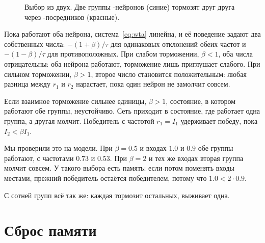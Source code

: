 \begin{figure}[t]
\centering
{}
\caption{Выбор из двух. Две группы -нейронов (синие) тормозят друг друга через -посредников (красные).}
\label{fig:wta}
\end{figure}

Пока работают оба нейрона, система~\eqref{eq:wta} линейна, и её поведение задают два собственных числа: $-(1+\beta)/\tau$ для одинаковых отклонений обеих частот и $-(1-\beta)/\tau$ для противоположных. При слабом торможении, $\beta<1$, оба числа отрицательны: оба нейрона работают, торможение лишь приглушает слабого. При сильном торможении, $\beta>1$, второе число становится положительным: любая разница между $r_1$ и $r_2$ нарастает, пока один нейрон не замолчит совсем.

\begin{keyblock}
\begin{proposition}
\label{prop:wta}
Если взаимное торможение сильнее единицы, $\beta>1$, состояние, в котором работают обе группы, неустойчиво. Сеть приходит в состояние, где работает одна группа, а другая молчит. Победитель с частотой $r_1=I_1$ удерживает победу, пока $I_2<\beta I_1$.
\end{proposition}
\end{keyblock}

Мы проверили это на модели. При $\beta=0.5$ и входах $1.0$ и $0.9$ обе группы работают, с частотами $0.73$ и $0.53$. При $\beta=2$ и тех же входах вторая группа молчит совсем. У такого выбора есть память: если потом поменять входы местами, прежний победитель остаётся победителем, потому что $1.0<2\cdot0.9$.

С сотней групп всё так же: каждая тормозит остальных, выживает одна.

\section{Сброс памяти}


